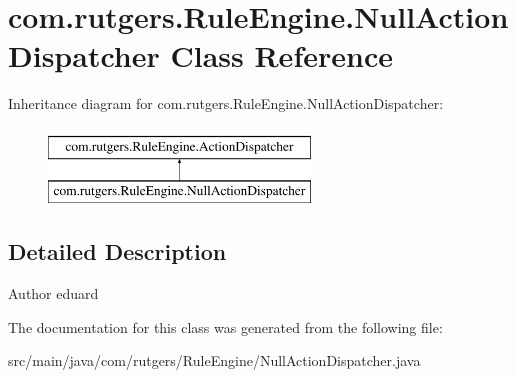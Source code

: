 \hypertarget{classcom_1_1rutgers_1_1RuleEngine_1_1NullActionDispatcher}{}\section{com.\+rutgers.\+Rule\+Engine.\+Null\+Action\+Dispatcher Class Reference}
\label{classcom_1_1rutgers_1_1RuleEngine_1_1NullActionDispatcher}
Inheritance diagram for com.\+rutgers.\+Rule\+Engine.\+Null\+Action\+Dispatcher\+:\begin{figure}[H]
\begin{center}
\leavevmode
\includegraphics[height=2.000000cm]{classcom_1_1rutgers_1_1RuleEngine_1_1NullActionDispatcher}
\end{center}
\end{figure}


\subsection{Detailed Description}
\begin{DoxyAuthor}{Author}
eduard 
\end{DoxyAuthor}


The documentation for this class was generated from the following file\+:\begin{DoxyCompactItemize}
\item 
src/main/java/com/rutgers/\+Rule\+Engine/Null\+Action\+Dispatcher.\+java\end{DoxyCompactItemize}
